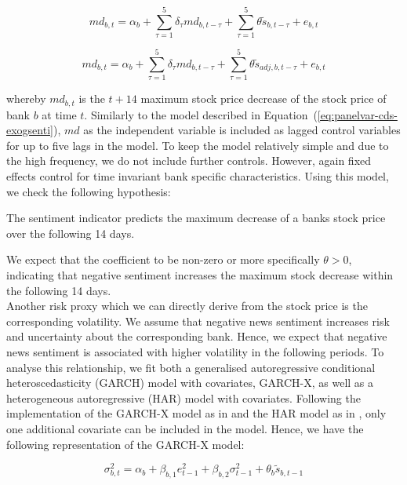 \begin{equation} \label{eq:mdd}
	md_{b,t} = \alpha_b + \sum_{\tau=1}^5\delta_\tau md_{b,t-\tau} + \sum_{\tau=1}^5 \theta \tilde{s}_{b,t-\tau} + e_{b,t}
\end{equation}

\begin{equation} \label{eq:mdd}
	md_{b,t} = \alpha_b + \sum_{\tau=1}^5\delta_\tau md_{b,t-\tau} + \sum_{\tau=1}^5 \theta \tilde{s}_{adj,b,t-\tau} + e_{b,t}
\end{equation}

whereby $md_{b,t}$ is the $t+14$ maximum stock price decrease of the stock price of bank $b$ at time $t$. Similarly to the model described in \mbox{Equation~(\ref{eq:panelvar-cds-exogsenti})}, $md$ as the independent variable is included as lagged control variables for up to five lags in the model. To keep the model relatively simple and due to the high frequency, we do not include further controls. However, again fixed effects control for time invariant bank specific characteristics. Using this model, we check the following hypothesis:

\begin{hyp}
	The sentiment indicator predicts the maximum decrease of a banks stock price over the following 14 days.
\end{hyp}

We expect that the coefficient to be non-zero or more specifically $\theta>0$, indicating that negative sentiment increases the maximum stock decrease within the following 14 days. \\

Another risk proxy which we can directly derive from the stock price is the corresponding volatility. We assume that negative news sentiment increases risk and uncertainty about the corresponding bank. Hence, we expect that negative news sentiment is associated with higher volatility in the following periods. To analyse this relationship, we fit both a generalised autoregressive conditional heteroscedasticity (GARCH) model with covariates, GARCH-X, as well as a heterogeneous autoregressive (HAR) model with covariates. Following the implementation of the GARCH-X model as in \cite{sucarrat2021} and the HAR model as in \cite{boudt2022}, only one additional covariate can be included in the model. Hence, we have the following representation of the GARCH-X model: 

\begin{equation}
	\sigma^2_{b,t} = \alpha_b + \beta_{b,1}e^2_{t-1} + \beta_{b,2}\sigma^2_{t-1} + \theta_b\tilde{s}_{b,t-1}
\end{equation}

